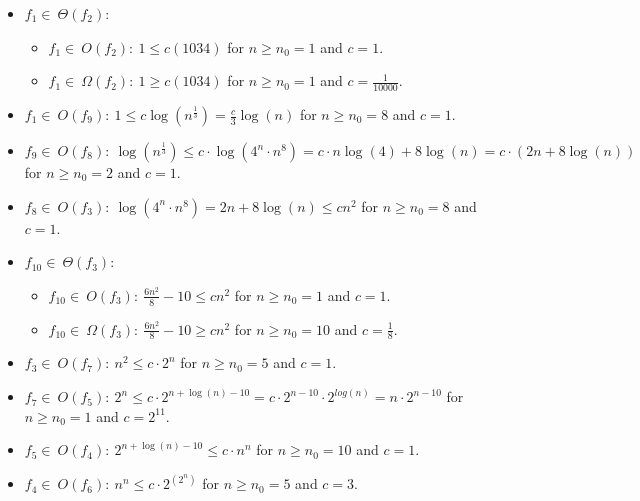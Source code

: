 \documentclass[a4paper]{article}
\theoremstyle{remarksStyle}
\theoremstyle{questionStyle}
\theoremstyle{answerStyle}
\begin{document}
\begin{boxxed}
\begin{itemize}
   \item  $f_{1} \in \ \Theta(f_{2}):$
      \begin{itemize}
          \item   $f_{1} \in \ O(f_{2}): \ 1 \leq c(1034)$ for $n \ge n_0 =1$ and $c=1$.
         \item $f_{1} \in \ \Omega(f_{2}): \ 1 \geq c(1034)$ for $n \ge n_0 =1$ and $c=\frac{1}{10000}$.
     \end{itemize} 

    \item $f_{1} \in \ O(f_{9}): \ 1 \leq c\log(n^\frac{1}{3}) = \frac{c}{3} \log(n) $ for $n \ge n_0 =8$ and $c=1$.

    \item $f_{9} \in \ O(f_{8}): \ \log(n^\frac{1}{3}) \leq c \cdot \log(4^n \cdot n^8) = c \cdot n \log(4) + 8 \log(n) = c \cdot (2n + 8\log(n)) $ for $n \ge n_0 =2$ and $c=1$.

    \item $f_{8} \in \ O(f_{3}): \ \log(4^n \cdot n^8) = 2n + 8\log(n) \leq cn^2 $ for $n \ge n_0 =8$ and $c=1$.
    
    \item  $f_{10} \in \ \Theta(f_{3}):$
      \begin{itemize}
          \item   $f_{10} \in \ O(f_{3}): \ \frac{6n^2}{8} - 10 \leq cn^2 $ for $n \ge n_0 =1$ and $c=1$.
         \item $f_{10} \in \ \Omega(f_{3}): \ \frac{6n^2}{8} - 10 \geq cn^2$ for $n \ge n_0 =10$ and $c=\frac{1}{8}$.
     \end{itemize} 

    \item $f_{3} \in \ O(f_{7}): \ n^2 \leq c \cdot 2^n $ for $n \ge n_0 =5$ and $c=1$.
    
    \item $f_{7} \in \ O(f_{5}): \ 2^n \leq c \cdot 2^{n + \log(n) -10} = c \cdot 2^{n-10} \cdot 2^{log(n)} = n \cdot 2^{n-10} $ for $n \ge n_0 =1$ and $c=2^{11}$.

    \item $f_{5} \in \ O(f_{4}): \ 2^{n + \log(n) -10} \leq c \cdot n^n $ for $n \ge n_0 =10$ and $c=1$.

    \item $f_{4} \in \ O(f_{6}): \ n^n \leq c \cdot 2^{(2^n)} $ for $n \ge n_0 =5$ and $c=3$.
    

\end{itemize} 

\end{boxxed}
\end{document}
